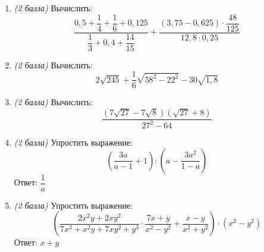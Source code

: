 \documentclass[12pt, a4paper]{article}
\begin{document}
	
	
	\begin{enumerate}
		\item \textit{(2 балла)} Вычислить:
		$$\dfrac{0,5+\dfrac{1}{4}+\dfrac{1}{6}+0,125}{\dfrac{1}{3}+0,4+\dfrac{14}{15}}+\dfrac{(3,75-0,625)\cdot\dfrac{48}{125}}{12,8\cdot0,25}$$
		\item \textit{(2 балла)} Вычислить:
		$$2\sqrt{245}+\dfrac{1}{6}\sqrt{58^2-22^2}-30\sqrt{1,8}$$
		\item \textit{(2 балла)} Вычислить:
		$$\dfrac{(7\sqrt{27}-7\sqrt{8})(\sqrt{27}+8)}{27^2-64}$$
		\item \textit{(2 балла)} Упростить выражение:
		$$\left(\dfrac{3a}{a-1}+1\right):\left(a-\dfrac{3a^2}{1-a}\right)$$
		Ответ: $\dfrac{1}{a}$
		\item \textit{(2 балла)} Упростить выражение:
		$$\left(\dfrac{2x^2y+2xy^2}{7x^3+x^2y+7xy^2+y^3}\cdot\dfrac{7x+y}{x^2-y^2}+\dfrac{x-y}{x^2+y^2}\right)\cdot(x^2-y^2)$$
		Ответ: $x+y$
	\end{enumerate}
\end{document}

